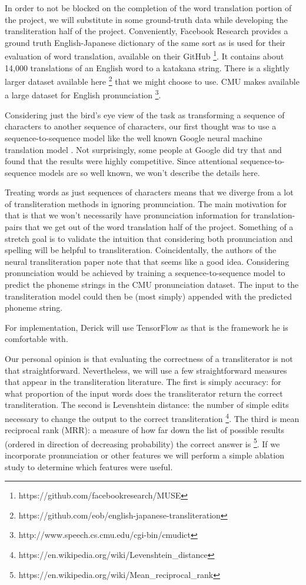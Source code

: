 \documentclass{article}
\begin{document}
In order to not be blocked on
the completion of the word translation portion of the project,
we will substitute in some ground-truth data
while developing the transliteration half of the project.
Conveniently,
Facebook Research provides a ground truth English-Japanese dictionary
of the same sort as is used for their evaluation of word translation,
available on their GitHub
\footnote{https://github.com/facebookresearch/MUSE}.
It contains about 14,000 translations of an English word to a katakana string.
There is a slightly larger dataset available here
\footnote{https://github.com/eob/english-japanese-transliteration}
that we might choose to use.
CMU makes available a large dataset for English pronunciation
\footnote{http://www.speech.cs.cmu.edu/cgi-bin/cmudict}.

Considering just the bird's eye view of the task
as transforming a sequence of characters to another sequence of characters,
our first thought was to use a sequence-to-sequence model
like the well known Google neural machine translation model
\cite{Wu2016GooglesNM}.
Not surprisingly,
some people at Google did try that \cite{Rosca2016SequencetosequenceNN}
and found that the results were highly competitive.
Since attentional sequence-to-sequence models \cite{Bahdanau2015NeuralMT}
are so well known,
we won't describe the details here.

Treating words as just sequences of characters
means that we diverge from a lot of transliteration methods
in ignoring pronunciation.
The main motivation for that
is that we won't necessarily have pronunciation information for translation-pairs
that we get out of the word translation half of the project.
Something of a stretch goal is to validate the intuition
that considering both pronunciation and spelling will be helpful to transliteration.
Coincidentally,
the authors of the neural transliteration paper \cite{Rosca2016SequencetosequenceNN}
note that that seems like a good idea.
Considering pronunciation would be achieved by
training a sequence-to-sequence model to predict
the phoneme strings in the CMU pronunciation dataset.
The input to the transliteration model could then be
(most simply) appended with the predicted phoneme string.

For implementation,
Derick will use TensorFlow as that is the framework he is comfortable with.

Our personal opinion is that evaluating the correctness
of a transliterator is not that straightforward.
Nevertheless,
we will use a few straightforward measures
that appear in the transliteration literature.
The first is simply accuracy:
for what proportion of the input words
does the transliterator return the correct transliteration.
The second is Levenshtein distance:
the number of simple edits necessary to change the output to
the correct transliteration
\footnote{https://en.wikipedia.org/wiki/Levenshtein_distance}.
The third is mean reciprocal rank (MRR):
a measure of how far down the list of possible results
(ordered in direction of decreasing probability)
the correct answer is
\footnote{https://en.wikipedia.org/wiki/Mean_reciprocal_rank}.
If we incorporate pronunciation or other features
we will perform a simple ablation study
to determine which features were useful.
\end{document}
